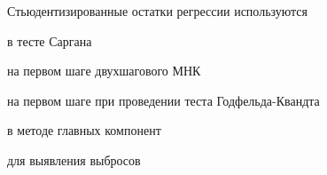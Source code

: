 
\begin{question}
Стьюдентизированные остатки регрессии используются
\begin{answerlist}
  \item в тесте Саргана
  \item на первом шаге двухшагового МНК
  \item на первом шаге при проведении теста Годфельда-Квандта
  \item в методе главных компонент
  \item для выявления выбросов
\end{answerlist}
\end{question}


